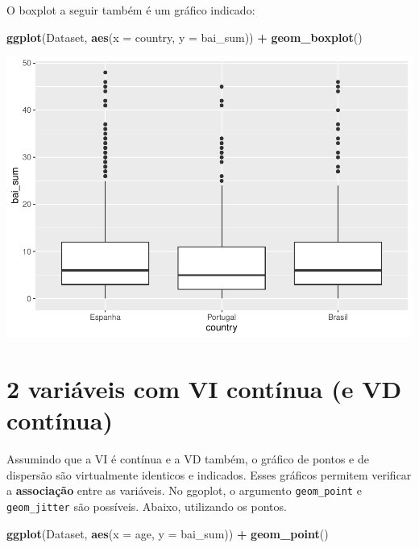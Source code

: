 \documentclass[
]{book}
\newenvironment{Shaded}{\begin{snugshade}}{\end{snugshade}}
\newcommand{\DataTypeTok}[1]{\textcolor[rgb]{0.13,0.29,0.53}{#1}}
\newcommand{\KeywordTok}[1]{\textcolor[rgb]{0.13,0.29,0.53}{\textbf{#1}}}
\newcommand{\NormalTok}[1]{#1}
\newcommand{\OperatorTok}[1]{\textcolor[rgb]{0.81,0.36,0.00}{\textbf{#1}}}
\newcommand{\StringTok}[1]{\textcolor[rgb]{0.31,0.60,0.02}{#1}}
\begin{document}
O boxplot a seguir também é um gráfico indicado:

\begin{Shaded}
\begin{Highlighting}[]
\KeywordTok{ggplot}\NormalTok{(Dataset, }\KeywordTok{aes}\NormalTok{(}\DataTypeTok{x =}\NormalTok{ country, }\DataTypeTok{y =}\NormalTok{ bai_sum)) }\OperatorTok{+}
\StringTok{  }\KeywordTok{geom_boxplot}\NormalTok{()}
\end{Highlighting}
\end{Shaded}

\begin{center}\includegraphics{gitbook-demo_files/figure-latex/unnamed-chunk-21-1} \end{center}

\hypertarget{variuxe1veis-com-vi-contuxednua-e-vd-contuxednua}{%
\section{2 variáveis com VI contínua (e VD contínua)}\label{variuxe1veis-com-vi-contuxednua-e-vd-contuxednua}}

Assumindo que a VI é contínua e a VD também, o gráfico de pontos e de dispersão são virtualmente identicos e indicados. Esses gráficos permitem verificar a \textbf{associação} entre as variáveis. No ggoplot, o argumento \texttt{geom\_point} e \texttt{geom\_jitter} são possíveis. Abaixo, utilizando os pontos.

\begin{Shaded}
\begin{Highlighting}[]
\KeywordTok{ggplot}\NormalTok{(Dataset, }\KeywordTok{aes}\NormalTok{(}\DataTypeTok{x =}\NormalTok{ age, }\DataTypeTok{y =}\NormalTok{ bai_sum)) }\OperatorTok{+}
\StringTok{  }\KeywordTok{geom_point}\NormalTok{()}
\end{Highlighting}
\end{Shaded}
\end{document}
